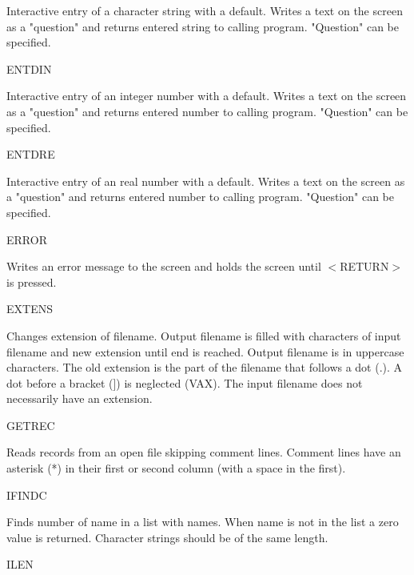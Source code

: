 \begin{indenting}{2.54cm}
Interactive entry of a character string with a default. Writes a text on the
screen as a "question" and returns entered string to calling program.
"Question" can be specified.
\end{indenting}
ENTDIN
\testlastline

\begin{indenting}{2.54cm}
Interactive entry of an integer number with a default. Writes a text on the
screen as a "question" and returns entered number to calling program.
"Question" can be specified.
\end{indenting}

\bigskip
ENTDRE
\testlastline

\begin{indenting}{2.54cm}
Interactive entry of an real number with a default. Writes a text on the
screen as a "question" and returns entered number to calling program.
"Question" can be specified.
\end{indenting}
ERROR
\testlastline

\begin{indenting}{2.54cm}
Writes an error message to the screen and holds the screen until $<$RE\-TURN$>$ is pressed.
\end{indenting}
EXTENS
\testlastline

\begin{indenting}{2.54cm}
Changes extension of filename. Output filename is filled with characters of
input filename and new extension until end is reached. Output filen\-ame is
in uppercase characters. The old extension is the part of the filename that
follows a dot (.). A dot before a bracket (]) is neglected (VAX). The input
filename does not necessarily have an extension.
\end{indenting}
GETREC
\testlastline

\begin{indenting}{2.54cm}
Reads records from an open file skipping comment lines. Comment lines
have an asterisk (*) in their first or second column (with a space in the
first).
\end{indenting}
IFINDC
\testlastline

\begin{indenting}{2.54cm}
Finds number of name in a list with names. When name is not in the list a
zero value is returned. Character strings should be of the same length.
\end{indenting}
ILEN
\testlastline

